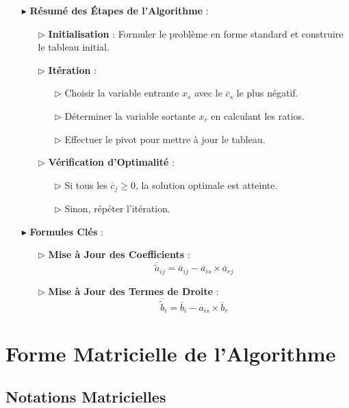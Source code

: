 \documentclass{report}
\begin{document}
\begin{multicols*}{2}
\begin{itemize}
    \item[$\blacktriangleright$] \textbf{Résumé des Étapes de l'Algorithme} :
    \begin{enumerate}
        \item[$\rhd$] \textbf{Initialisation} : Formuler le problème en forme standard et construire le tableau initial.
        \item[$\rhd$] \textbf{Itération} :
        \begin{enumerate}
            \item[$\rhd$] Choisir la variable entrante \( x_s \) avec le \( \overline{c}_s \) le plus négatif.
            \item[$\rhd$] Déterminer la variable sortante \( x_r \) en calculant les ratios.
            \item[$\rhd$] Effectuer le pivot pour mettre à jour le tableau.
        \end{enumerate}
        \item[$\rhd$] \textbf{Vérification d'Optimalité} :
        \begin{itemize}
            \item[$\rhd$] Si tous les \( \overline{c}_j \geq 0 \), la solution optimale est atteinte.
            \item[$\rhd$] Sinon, répéter l'itération.
        \end{itemize}
    \end{enumerate}

    \item[$\blacktriangleright$] \textbf{Formules Clés} :
    \begin{itemize}
        \item[$\rhd$] \textbf{Mise à Jour des Coefficients} :
        \[
            \boxed{\overline{\tilde{a}}_{ij} = \overline{a}_{ij} - \overline{a}_{is} \times \overline{a}_{rj}}
        \]
        \item[$\rhd$] \textbf{Mise à Jour des Termes de Droite} :
        \[
            \boxed{\overline{\tilde{b}}_i = \overline{b}_i - \overline{a}_{is} \times \overline{b}_r}
        \]
    \end{itemize}
\end{itemize}
\section{Forme Matricielle de l'Algorithme}

\subsection*{Notations Matricielles}


\end{multicols*}
\end{document}
